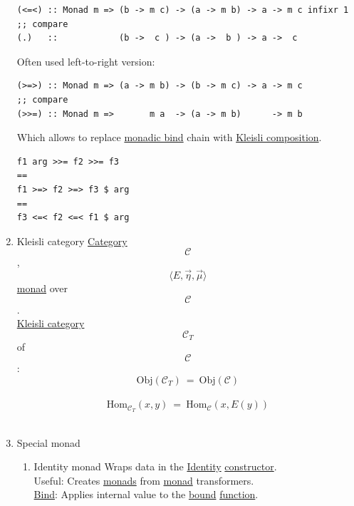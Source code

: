 \documentclass[11pt]{article}
\begin{document}
\begin{enumerate}
\begin{verbatim}
(<=<) :: Monad m => (b -> m c) -> (a -> m b) -> a -> m c infixr 1
;; compare
(.)   ::            (b ->  c ) -> (a ->  b ) -> a ->  c
\end{verbatim}

Often used left-to-right version:\\

\begin{verbatim}
(>=>) :: Monad m => (a -> m b) -> (b -> m c) -> a -> m c
;; compare
(>>=) :: Monad m =>       m a  -> (a -> m b)      -> m b
\end{verbatim}

Which allows to replace \hyperref[orgcde729d]{monadic bind} chain with \hyperref[org2eea7d7]{Kleisli composition}.\\

\begin{verbatim}
f1 arg >>= f2 >>= f3
==
f1 >=> f2 >=> f3 $ arg
==
f3 <=< f2 <=< f1 $ arg
\end{verbatim}

\item \label{orge4fe430}Kleisli category
\label{sec:orgbfea53f}
\hyperref[org3e3a79b]{Category} $$ \mathcal{C} $$, $$ 〈E, \overrightarrow{\eta}, \overrightarrow{\mu}〉 $$ \hyperref[org268aaf1]{monad} over $$ \mathcal{C} $$.\\

\hyperref[orge4fe430]{Kleisli category} $$ \mathcal{C}_{T} $$ of $$ \mathcal{C} $$:\\

$$ \mathrm{Obj}(\mathcal{C}_{T}) \ = \ \mathrm{Obj}(\mathcal{C}) $$\\
$$ \mathrm{Hom}_{\mathcal{C}_{T}}(x,y) \ = \ \mathrm{Hom}_{\mathcal{C}}(x,E(y)) $$\\

\item \label{org31b4a8d}Special monad
\label{sec:org488f054}
\begin{enumerate}
\item \label{orgc678b49}Identity monad
\label{sec:orgb6380fc}
Wraps data in the \hyperref[org3bbbadd]{Identity} \hyperref[orgd019743]{constructor}.\\

Useful: Creates \hyperref[org3ecde32]{monads} from \hyperref[org268aaf1]{monad} transformers.\\

\hyperref[org8b7f62c]{Bind}: Applies internal value to the \hyperref[org7d65bda]{bound} \hyperref[orgeb5cddb]{function}.\\


\end{enumerate}
\end{enumerate}
\end{document}
